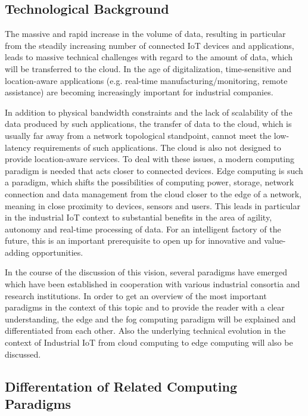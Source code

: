 \subsection{Technological Background}\label{2.1}
 The massive and rapid increase in the volume of data, resulting in particular from the steadily increasing number of connected IoT devices and applications, leads to massive technical challenges with regard to the amount of data, which will be transferred to the cloud. In the age of digitalization, time-sensitive and location-aware applications (e.g. real-time manufacturing/monitoring, remote assistance) are becoming increasingly important for industrial companies.\par
In addition to physical bandwidth constraints and the lack of scalability of the data produced by such applications, the transfer of data to the cloud, which is usually far away from a network topological standpoint, cannot meet the low-latency requirements of such applications. The cloud is also not designed to provide location-aware services. To deal with these issues, a modern computing paradigm is needed that acts closer to connected devices. Edge computing is such a paradigm, which shifts the possibilities of computing power, storage, network connection and data management from the cloud closer to the edge of a network, meaning in close proximity to devices, sensors and users.
 This leads in particular in the industrial IoT context to substantial benefits in the area of agility, autonomy and real-time processing of data. For an intelligent factory of the future, this is an important prerequisite to open up for innovative and value-adding opportunities.\par 
In the course of the discussion of this vision, several paradigms have emerged which have been established in cooperation with various industrial consortia and research institutions. In order to get an overview of the most important paradigms in the context of this topic and to provide the reader with a clear understanding, the edge and the fog computing paradigm will be explained and differentiated from each other. Also the underlying technical evolution in the context of Industrial IoT from cloud computing to edge computing will also be discussed.

\subsection{Differentation of Related Computing Paradigms}
\\

